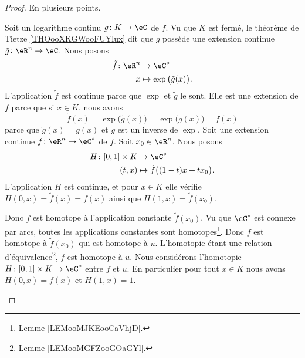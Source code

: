 \begin{proof}
    En plusieurs points.
    \begin{subproof}
        \spitem[\ref{ITEMooKZYDooKoEEbl} \( \Rightarrow\) \ref{ITEMooQDHXooObjxLA}]
        Soit un logarithme continu \( g\colon K\to \eC\) de \( f\). Vu que \( K\) est fermé, le théorème de Tietze \ref{THOooXKGWooFUYlux} dit que \( g\) possède une extension continue \( \tilde g\colon \eR^n\to \eC\). Nous posons
        \begin{equation}
            \begin{aligned}
                \tilde f\colon \eR^n&\to \eC^* \\
                x&\mapsto \exp\big( \tilde g(x) \big). 
            \end{aligned}
        \end{equation}
        L'application \( \tilde f\) est continue parce que \( \exp\) et \( \tilde g\) le sont. Elle est une extension de \( f\) parce que si \( x\in K\), nous avons
        \begin{equation}
            \tilde f(x)=\exp\big( \tilde g(x) \big)=\exp\big( g(x) \big)=f(x)
        \end{equation}
        parce que \( \tilde g(x)=g(x)\) et \( g\) est un inverse de \( \exp\).
        \spitem[\ref{ITEMooQDHXooObjxLA} \( \Rightarrow\) \ref{ITEMooXVNXooVAHklr}]
        Soit une extension continue \( \tilde f\colon \eR^n\to \eC^*\) de \( f\). Soit \( x_0\in \eR^n\). Nous posons
        \begin{equation}
            \begin{aligned}
                H\colon \mathopen[ 0 , 1 \mathclose]\times K&\to \eC^* \\
                (t,x)&\mapsto \tilde f\big( (1-t)x+tx_0 \big). 
            \end{aligned}
        \end{equation}
        L'application \( H\) est continue, et pour \( x\in K\) elle vérifie \( H(0,x)=\tilde f(x)=f(x)\) ainsi que \( H(1,x)=\tilde f(x_0)\).

        Donc \( f\) est homotope à l'application constante \( \tilde f(x_0)\). Vu que \( \eC^*\) est connexe par arcs, toutes les applications constantes sont homotopes\footnote{Lemme \ref{LEMooMJKEooCaVhjD}.}. Donc \( f\) est homotope à \( \tilde f(x_0)\) qui est homotope à \( u\). L'homotopie étant une relation d'équivalence\footnote{Lemme \ref{LEMooMGFZooGOaGYl}.}, \( f\) est homotope à \( u\).
        \spitem[\ref{ITEMooXVNXooVAHklr} \( \Rightarrow\) \ref{ITEMooKZYDooKoEEbl}]
        Nous considérons l'homotopie \( H\colon \mathopen[ 0 , 1 \mathclose]\times K\to \eC^*\) entre \( f\) et \( u\). En particulier pour tout \( x\in K\) nous avons \( H(0,x)=f(x)\) et \( H(1,x)=1\).


\end{subproof}
\end{proof}
